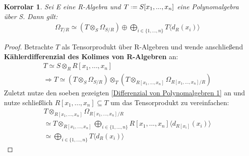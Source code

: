\documentclass[10pt,a4paper]{report}
\newcommand{\comment}[1]{}
\newcounter{Aussage}[chapter]
\newtheorem{korrolar}[Aussage]{Korrolar}
\newcommand{\divR}[2]{\Omega_{#1/#2}}
\newcommand{\divf}[1]{d_{#1}}
\newcommand{\Tensor}[3]{#1 \otimes_{#2} #3}
\newcommand*{\defeq}{\mathrel{\vcenter{\baselineskip0.5ex \lineskiplimit0pt
                     \hbox{\scriptsize.}\hbox{\scriptsize.}}}%
                     =}
\begin{document}
\begin{korrolar} \comment{\label{Differenzial von Polynomalgebren 2}}
Sei E eine R-Algebra und $T \defeq S[x_1,...,x_n]$ eine Polynomalgebra über S. Dann gilt:
\begin{gather*}
\divR{T}{R} \simeq (\Tensor{T}{S}{\divR{S}{R}}) \oplus \bigoplus_{i \in \lbrace 1,...,n \rbrace} T \langle \divf{R}(x_i) \rangle
\end{gather*}
\end{korrolar}
\begin{proof}
Betrachte $T$ als Tensorprodukt über R-Algebren und wende anschließend \textbf{Kählerdifferenzial des Kolimes von R-Algebren}\comment{\cref{Kählerdifferenzial des Kolimes von R-Algebren}} an:
\begin{gather*}
T \simeq \Tensor{S}{R}{R[x_1,...,x_n]} \\
\Rightarrow T \simeq \Tensor{(\Tensor{T}{S}{\divR{S}{R}})}{T}{(\Tensor{T}{R[x_1,...,x_n]}{\divR{R[x_1,...,x_n]}{R}})}
\end{gather*}
Zuletzt nutze den soeben gezeigten \cref{Differenzial von Polynomalgebren 1} an und nutze schließlich $R[x_1,...,x_n] \subseteq T$ um das Tensorprodukt zu vereinfachen:
\begin{gather*}
\Tensor{T}{R[x_1,...,x_n]}{\divR{R[x_1,...,x_n]}{R}}\\
\simeq \Tensor{T}{R[x_1,...,x_n]}{\bigoplus_{i \in \lbrace 1,...,n \rbrace} R[x_1,...,x_n]\langle \divf{R[x_i]}(x_i) \rangle } \\
\simeq \bigoplus_{i \in \lbrace 1,...,n \rbrace} T \langle \divf{R}(x_i) \rangle
\end{gather*}
\end{proof}
\end{document}
